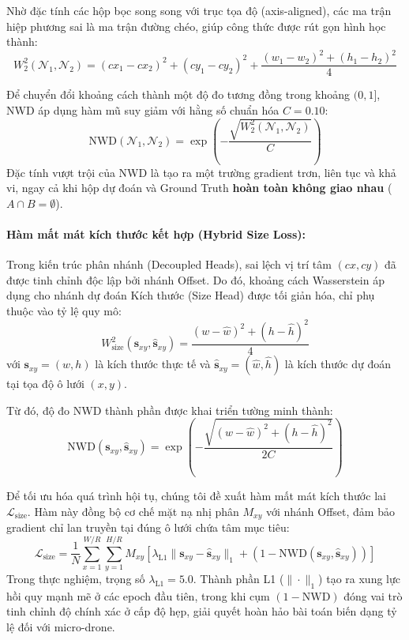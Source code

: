 \documentclass[11pt,a4paper]{article}
\begin{document}
Nhờ đặc tính các hộp bọc song song với trục tọa độ (axis-aligned), các ma trận hiệp phương sai là ma trận đường chéo, giúp công thức được rút gọn hình học thành:
\begin{equation}
    W_2^2(\mathcal{N}_1, \mathcal{N}_2) = (cx_1 - cx_2)^2 + (cy_1 - cy_2)^2 + \frac{(w_1 - w_2)^2 + (h_1 - h_2)^2}{4}
\end{equation}

Để chuyển đổi khoảng cách thành một độ đo tương đồng trong khoảng $(0, 1]$, NWD áp dụng hàm mũ suy giảm với hằng số chuẩn hóa $C = 0.10$:
\begin{equation}
    \text{NWD}(\mathcal{N}_1, \mathcal{N}_2) = \exp\left(-\frac{\sqrt{W_2^2(\mathcal{N}_1, \mathcal{N}_2)}}{C}\right)
\end{equation}
Đặc tính vượt trội của NWD là tạo ra một trường gradient trơn, liên tục và khả vi, ngay cả khi hộp dự đoán và Ground Truth \textbf{hoàn toàn không giao nhau} ($A \cap B = \emptyset$).

\paragraph{Hàm mất mát kích thước kết hợp (Hybrid Size Loss):}
Trong kiến trúc phân nhánh (Decoupled Heads), sai lệch vị trí tâm $(cx, cy)$ đã được tinh chỉnh độc lập bởi nhánh Offset. Do đó, khoảng cách Wasserstein áp dụng cho nhánh dự đoán Kích thước (Size Head) được tối giản hóa, chỉ phụ thuộc vào tỷ lệ quy mô:
\begin{equation}
    W_{\text{size}}^2(\mathbf{s}_{xy}, \hat{\mathbf{s}}_{xy}) = \frac{(w - \hat{w})^2 + (h - \hat{h})^2}{4}
\end{equation}
với $\mathbf{s}_{xy} = (w, h)$ là kích thước thực tế và $\hat{\mathbf{s}}_{xy} = (\hat{w}, \hat{h})$ là kích thước dự đoán tại tọa độ ô lưới $(x, y)$.

Từ đó, độ đo NWD thành phần được khai triển tường minh thành:
\begin{equation}
    \text{NWD}(\mathbf{s}_{xy}, \hat{\mathbf{s}}_{xy}) = \exp\left(-\frac{\sqrt{(w - \hat{w})^2 + (h - \hat{h})^2}}{2C}\right)
\end{equation}

Để tối ưu hóa quá trình hội tụ, chúng tôi đề xuất hàm mất mát kích thước lai $\mathcal{L}_{\text{size}}$. Hàm này đồng bộ cơ chế mặt nạ nhị phân $M_{xy}$ với nhánh Offset, đảm bảo gradient chỉ lan truyền tại đúng ô lưới chứa tâm mục tiêu:
\begin{equation}
    \mathcal{L}_{\text{size}} = \frac{1}{N} \sum_{x=1}^{W/R} \sum_{y=1}^{H/R} M_{xy} \left[ \lambda_{\text{L1}} \|\mathbf{s}_{xy} - \hat{\mathbf{s}}_{xy}\|_1 + \left(1 - \text{NWD}(\mathbf{s}_{xy}, \hat{\mathbf{s}}_{xy})\right) \right]
\end{equation}
Trong thực nghiệm, trọng số $\lambda_{\text{L1}} = 5.0$. Thành phần L1 ($\|\cdot\|_1$) tạo ra xung lực hồi quy mạnh mẽ ở các epoch đầu tiên, trong khi cụm $(1 - \text{NWD})$ đóng vai trò tinh chỉnh độ chính xác ở cấp độ hẹp, giải quyết hoàn hảo bài toán biến dạng tỷ lệ đối với micro-drone.
\end{document}
